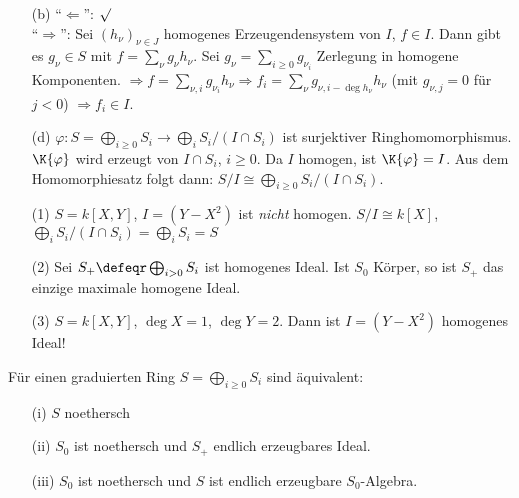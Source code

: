 \begin{Bew}
\begin{enumerate}
\item[(b)] ``$\Leftarrow$'': $\surd$\\
``$\Rightarrow$'': Sei $(h_{\nu})_{\nu\in J}$ homogenes Erzeugendensystem von $I$,
$f\in I$. Dann gibt es $g_\nu\in S$ mit $f=\sum_{\nu}g_\nu h_\nu$.
Sei $g_\nu=\sum_{i\geq 0}g_{\nu_i}$ Zerlegung in homogene Komponenten.
$\Rightarrow f=\sum_{\nu, i} g_{\nu_i}h_\nu
\Rightarrow f_i=\sum_\nu g_{\nu,i-\deg{h_\nu}}h_\nu$ 
(mit $g_{\nu,j}=0$ f\"ur $j< 0$) $\Rightarrow f_i\in I$.

\item[(d)] $\varphi:S=\bigoplus_{i\geq 0}S_i\to \bigoplus_i S_i/(I\cap S_i)$ ist
surjektiver Ringhomomorphismus. $\K{\varphi}$ wird erzeugt von $I\cap S_i$, $i\geq 0$.
Da $I$ homogen, ist $\K{\varphi}=I$. Aus dem Homomorphiesatz folgt dann:
$S/I\cong \bigoplus_{i\geq 0}S_i/(I\cap S_i)$.
\end{enumerate}
\end{Bew}

\begin{nnBsp}
\begin{enumerate}

\item[(1)] $S=k[X,Y]$, $I=(Y-X^2)$ ist \emph{nicht} homogen.
$S/I\cong k[X]$, $\bigoplus_i S_i/(I\cap S_i)=\bigoplus_i S_i=S$

\item[(2)] Sei $S_{+}\defeqr\bigoplus_{i> 0}S_i$ ist homogenes Ideal.
Ist $S_0$ K\"orper, so ist $S_{+}$ das einzige maximale homogene Ideal.

\item[(3)] $S=k[X,Y]$, $\deg{X}=1$, $\deg{Y}=2$. 
Dann ist $I=(Y-X^2)$ homogenes Ideal!

\end{enumerate}
\end{nnBsp}

\begin{DefBem}
\label{2.15}
F\"ur einen graduierten Ring $S=\bigoplus_{i\geq 0} S_i$ sind \"aquivalent:
\begin{enumerate}
\item[(i)] $S$ noethersch
\item[(ii)] $S_0$ ist noethersch und $S_{+}$ endlich erzeugbares Ideal.
\item[(iii)] $S_0$ ist noethersch und $S$ ist endlich erzeugbare $S_0$-Algebra.
\end{enumerate}
\end{DefBem}


